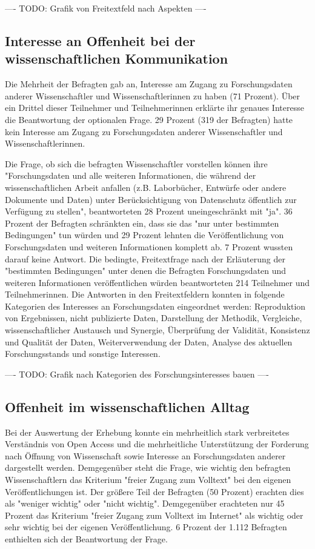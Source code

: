 ---- TODO: Grafik von Freitextfeld nach Aspekten ----

\subsection{Interesse an Offenheit bei der wissenschaftlichen Kommunikation}

Die Mehrheit der Befragten gab an, Interesse am Zugang zu Forschungsdaten anderer Wissenschaftler und Wissenschaftlerinnen zu haben (71 Prozent). Über ein Drittel dieser Teilnehmer und Teilnehmerinnen erklärte ihr genaues Interesse die Beantwortung der optionalen Frage. 29 Prozent (319 der Befragten) hatte kein Interesse am Zugang zu Forschungsdaten anderer Wissenschaftler und Wissenschaftlerinnen.

Die Frage, ob sich die befragten Wissenschaftler vorstellen können ihre "Forschungsdaten und alle weiteren Informationen, die während der wissenschaftlichen Arbeit anfallen (z.B. Laborbücher, Entwürfe oder andere Dokumente und Daten) unter Berücksichtigung von Datenschutz öffentlich zur Verfügung zu stellen", beantworteten 28 Prozent uneingeschränkt mit "ja". 36 Prozent der Befragten schränkten ein, dass sie das "nur unter bestimmten Bedingungen" tun würden und 29 Prozent lehnten die Veröffentlichung von Forschungsdaten und weiteren Informationen komplett ab. 7 Prozent wussten darauf keine Antwort. Die bedingte, Freitextfrage nach der Erläuterung der "bestimmten Bedingungen" unter denen die Befragten Forschungsdaten und weiteren Informationen veröffentlichen würden beantworteten 214 Teilnehmer und Teilnehmerinnen. Die Antworten in den Freitextfeldern konnten in folgende Kategorien des Interesses an Forschungsdaten eingeordnet werden: Reproduktion von Ergebnissen, nicht publizierte Daten, Darstellung der Methodik, Vergleiche, wissenschaftlicher Austausch und Synergie, Überprüfung der Validität, Konsistenz und Qualität der Daten, Weiterverwendung der Daten, Analyse des aktuellen Forschungsstands und sonstige Interessen.

---- TODO: Grafik nach Kategorien des Forschungsinteresses bauen ----

\subsection{Offenheit im wissenschaftlichen Alltag}

Bei der Auswertung der Erhebung konnte ein mehrheitlich stark verbreitetes Verständnis von Open Access und die mehrheitliche Unterstützung der Forderung nach Öffnung von Wissenschaft sowie Interesse an Forschungsdaten anderer dargestellt werden. Demgegenüber steht die Frage, wie wichtig den befragten Wissenschaftlern das Kriterium "freier Zugang zum Volltext" bei den eigenen Veröffentlichungen ist. Der größere Teil der Befragten (50 Prozent) erachten dies als "weniger wichtig" oder "nicht wichtig". Demgegenüber erachteten nur 45 Prozent das Kriterium "freier Zugang zum Volltext im Internet" als wichtig oder sehr wichtig bei der eigenen Veröffentlichung. 6 Prozent der 1.112 Befragten enthielten sich der Beantwortung der Frage.

